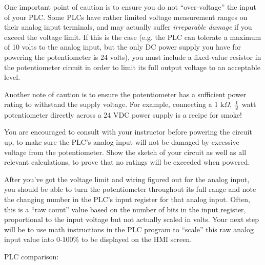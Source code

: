 \documentclass[12pt,a4paper]{article}
\begin{document}
\vskip 10pt

One important point of caution is to ensure you do not ``over-voltage'' the input of your PLC.  Some PLCs have rather limited voltage measurement ranges on their analog input terminals, and may actually suffer {\it irreparable damage} if you exceed the voltage limit.  If this is the case (e.g. the PLC can tolerate a maximum of 10 volts to the analog input, but the only DC power supply you have for powering the potentiometer is 24 volts), you must include a fixed-value resistor in the potentiometer circuit in order to limit its full output voltage to an acceptable level.

Another note of caution is to ensure the potentiometer has a sufficient power rating to withstand the supply voltage.  For example, connecting a 1 k$\Omega$, ${1 \over 2}$ watt potentiometer directly across a 24 VDC power supply is a recipe for smoke!

\vskip 10pt

You are encouraged to consult with your instructor before powering the circuit up, to make sure the PLC's analog input will not be damaged by excessive voltage from the potentiometer.  Show the sketch of your circuit as well as all relevant calculations, to prove that no ratings will be exceeded when powered.

\vskip 10pt

After you've got the voltage limit and wiring figured out for the analog input, you should be able to turn the potentiometer throughout its full range and note the changing number in the PLC's input register for that analog input.  Often, this is a ``raw count'' value based on the number of bits in the input register, proportional to the input voltage but not actually scaled in volts.  Your next step will be to use math instructions in the PLC program to ``scale'' this raw analog input value into 0-100\% to be displayed on the HMI screen.

\vfil 

\noindent
PLC comparison:
\end{document}
